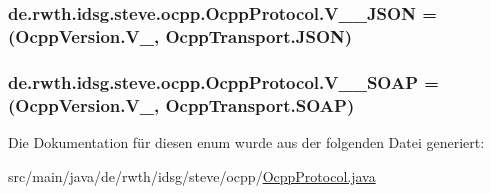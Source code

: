 \hypertarget{enumde_1_1rwth_1_1idsg_1_1steve_1_1ocpp_1_1_ocpp_protocol_a80b0fbd3a74af3443ec943f4e32fe7fa}{
\subsubsection[{V\+\_\+15\+\_\+\+J\+S\+O\+N}]{\setlength{\rightskip}{0pt plus 5cm}de.\+rwth.\+idsg.\+steve.\+ocpp.\+Ocpp\+Protocol.\+V\+\_\+\_\+\+J\+S\+O\+N =({\bf Ocpp\+Version.\+V\+\_}, {\bf Ocpp\+Transport.\+J\+S\+O\+N})}}\label{enumde_1_1rwth_1_1idsg_1_1steve_1_1ocpp_1_1_ocpp_protocol_a80b0fbd3a74af3443ec943f4e32fe7fa}
\hypertarget{enumde_1_1rwth_1_1idsg_1_1steve_1_1ocpp_1_1_ocpp_protocol_a7476dab1a43648c24ed27bb7a6dc4cc1}{
\subsubsection[{V\+\_\+15\+\_\+\+S\+O\+A\+P}]{\setlength{\rightskip}{0pt plus 5cm}de.\+rwth.\+idsg.\+steve.\+ocpp.\+Ocpp\+Protocol.\+V\+\_\+\_\+\+S\+O\+A\+P =({\bf Ocpp\+Version.\+V\+\_}, {\bf Ocpp\+Transport.\+S\+O\+A\+P})}}\label{enumde_1_1rwth_1_1idsg_1_1steve_1_1ocpp_1_1_ocpp_protocol_a7476dab1a43648c24ed27bb7a6dc4cc1}


Die Dokumentation für diesen enum wurde aus der folgenden Datei generiert\+:\begin{DoxyCompactItemize}
\item 
src/main/java/de/rwth/idsg/steve/ocpp/\hyperlink{_ocpp_protocol_8java}{Ocpp\+Protocol.\+java}\end{DoxyCompactItemize}
